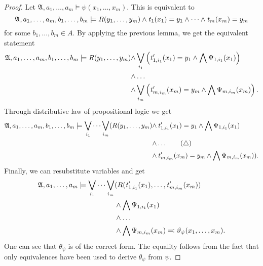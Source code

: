 \begin{proof}
	Let $\mathfrak A,a_1,\dots,a_m\models\psi(x_1,\dots,x_m)$.
	This is equivalent to 
	$$\mathfrak A,a_1,\dots,a_m,b_1,\dots,b_m\models R(y_1,\dots,y_m)\land \operatorname{\mathit{t}}_1(x_1)=y_1\land\dots\land \operatorname{\mathit{t}}_m(x_m)=y_m$$
	for some $b_1,\dots,b_m\in A$.
	By applying the previous lemma, we get the equivalent statement
	\begin{align*}
		\mathfrak A,a_1,\dots,a_m,b_1,\dots,b_m\models R(y_1,\dots,y_m) \land& \bigvee_{i_1}\left(\operatorname{\mathit{t}}_{1,i_1}'(x_1)=y_1\land \bigwedge\Psi_{1,i_1}(x_1)\right) \\
		\land& \dots \\
		\land& \bigvee_{i_m}\left(\operatorname{\mathit{t}}_{m,i_m}'(x_m)=y_m\land \bigwedge\Psi_{m,i_m}(x_m)\right).
	\end{align*}
	Through distributive law of propositional logic we get
	\begin{align*}
		\mathfrak A,a_1,\dots,a_m,b_1,\dots,b_m\models \bigvee_{i_1} \dots \bigvee_{i_m} ( R(y_1,\dots,y_m)\land & \operatorname{\mathit{t}}_{1,i_1}'(x_1)=y_1 \land \bigwedge\Psi_{1,i_1}(x_1) \\
		\land & \dots \tag{$\triangle$}\\
		\land & \operatorname{\mathit{t}}_{m,i_m}'(x_m)=y_m \land \bigwedge\Psi_{m,i_m}(x_m) ).
	\end{align*}
	Finally, we can resubstitute variables and get
	\begin{align*}
		\mathfrak A,a_1,\dots,a_m\models \bigvee_{i_1}\dots\bigvee_{i_m} &(R(\operatorname{\mathit{t}}_{1,i_1}'(x_1),\dots,\operatorname{\mathit{t}}_{m,i_m}'(x_m)) \\
		&\land \bigwedge\Psi_{1,i_1}(x_1) \\
		&\land\dots \\
		&\land\bigwedge\Psi_{m,i_m}(x_m)\eqqcolon \vartheta_\psi(x_1,\dots,x_m).
	\end{align*}
	One can see that $\theta_\psi$ is of the correct form.
	The equality follows from the fact that only equivalences have been used to derive $\theta_\psi$ from $\psi$.
	

\end{proof}
